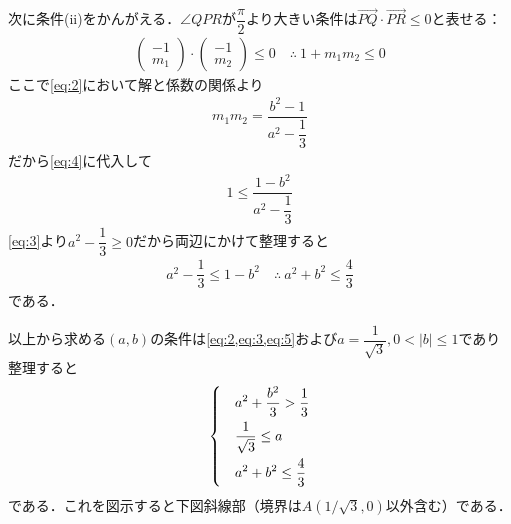 \documentclass[../../main.tex]{subfiles}
\begin{document}
次に条件(ii)をかんがえる．$\angle QPR$が$\dfrac{\pi}{2}$より大きい条件は$\overrightarrow{PQ}\cdot\overrightarrow{PR}\le0$と表せる：
\begin{align}
  \begin{pmatrix}-1\\m_1
  \end{pmatrix}\cdot
  \begin{pmatrix}-1\\m_2
  \end{pmatrix}\le0 \quad\therefore\ 1+m_1m_2\le0 \label{eq:4}
\end{align}
ここで\cref{eq:2}において解と係数の関係より
\begin{align}
  m_1m_2=\dfrac{b^2-1}{a^2-\dfrac{1}{3}}
\end{align}
だから\cref{eq:4}に代入して
\begin{align}
  1\le\dfrac{1-b^2}{a^2-\dfrac{1}{3}}
\end{align}
\cref{eq:3}より$a^2-\dfrac{1}{3}\ge0$だから両辺にかけて整理すると
\begin{align}
  a^2-\dfrac{1}{3}\le1-b^2 \quad\therefore\ a^2+b^2\le\dfrac{4}{3} \label{eq:5}
\end{align}
である．

以上から求める$(a,b)$の条件は\cref{eq:2,eq:3,eq:5}および$a = \dfrac{1}{\sqrt{3}}, 0 < |b| \le 1$であり整理すると
\begin{align}
  \begin{dcases}
    &a^2+\dfrac{b^2}{3} > \dfrac{1}{3} \\
    &\dfrac{1}{\sqrt{3}}\le a \\
    &a^2+b^2 \le \dfrac{4}{3}
  \end{dcases}
\end{align}
である．これを図示すると下図斜線部（境界は$A(1/\sqrt{3},0)$以外含む）である．
\end{document}
